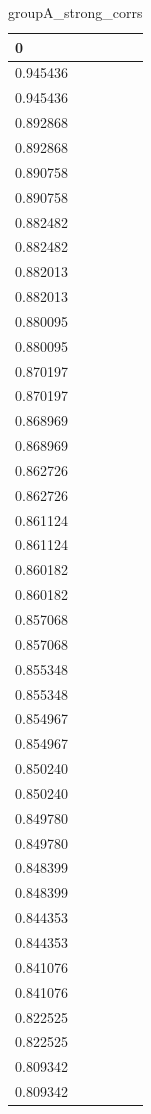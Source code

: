 \begin{table}
\caption{groupA_strong_corrs}
\label{tab:groupA_strong_corrs}
\begin{tabular}{lcr}
\toprule
0 \\
\midrule
0.945436 \\
0.945436 \\
0.892868 \\
0.892868 \\
0.890758 \\
0.890758 \\
0.882482 \\
0.882482 \\
0.882013 \\
0.882013 \\
0.880095 \\
0.880095 \\
0.870197 \\
0.870197 \\
0.868969 \\
0.868969 \\
0.862726 \\
0.862726 \\
0.861124 \\
0.861124 \\
0.860182 \\
0.860182 \\
0.857068 \\
0.857068 \\
0.855348 \\
0.855348 \\
0.854967 \\
0.854967 \\
0.850240 \\
0.850240 \\
0.849780 \\
0.849780 \\
0.848399 \\
0.848399 \\
0.844353 \\
0.844353 \\
0.841076 \\
0.841076 \\
0.822525 \\
0.822525 \\
0.809342 \\
0.809342 \\
\bottomrule
\end{tabular}
\end{table}
